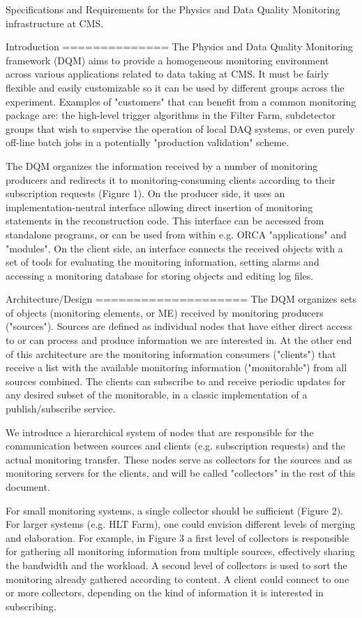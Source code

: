 Specifications and Requirements for the Physics and Data Quality
Monitoring infrastructure at CMS.

Introduction
==============
The Physics and Data Quality Monitoring framework (DQM) aims to
provide a homogeneous monitoring environment across various
applications related to data taking at CMS. It must be fairly flexible
and easily customizable so it can be used by different groups across the
experiment. Examples of "customers" that can benefit from a common monitoring
package are: the high-level trigger algorithms in the Filter Farm,
subdetector groups that wish to supervise the operation of local DAQ
systems, or even purely off-line batch jobs in a potentially
"production validation" scheme. 

The DQM organizes the information received by a number of monitoring
producers and redirects it to monitoring-consuming clients according to their
subscription requests (Figure 1). On the producer side, it uses an
implementation-neutral interface allowing direct insertion of
monitoring statements in the reconstruction code. This interface can
be accessed from standalone programs, or can be used from within
e.g. ORCA "applications" and "modules". On the client side, an
interface connects the received objects with a set of tools for
evaluating the monitoring information, setting alarms and accessing a
monitoring database for storing objects and editing log files.

Architecture/Design
====================
The DQM organizes sets of objects (monitoring elements, or ME)
received by monitoring producers ("sources"). Sources are defined as
individual nodes that have either direct access to or can process
and produce information we are interested in. At the other end of this
architecture are the monitoring information consumers ("clients") that
receive a list with the available monitoring information ("monitorable")
from all sources combined. The clients can subscribe to and receive
periodic updates for any desired subset of the monitorable, in a
classic implementation of a publish/subscribe service.

We introduce a hierarchical system of nodes that are responsible for
the communication between sources and clients (e.g. subscription
requests) and the actual monitoring transfer. These nodes serve as
collectors for the sources and as monitoring servers for the clients,
and will be called "collectors" in the rest of this document.

For small monitoring systems, a single collector should be
sufficient (Figure 2). For larger systems (e.g. HLT Farm), one could envision
different levels of merging and elaboration. For example, in Figure 3
a first level of collectors is responsible for gathering all
monitoring information from multiple sources, effectively sharing the
bandwidth and the workload. A second level of collectors is used to sort
the monitoring already gathered according to content. A client could
connect to one or more collectors, depending on the kind of
information it is interested in subscribing.

